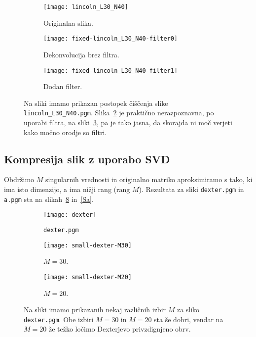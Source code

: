 \documentclass[a4 paper, 12pt]{article}
\begin{document}
\begin{figure}[H]\centering
	\begin{subfigure}[b]{0.3\textwidth}
		\texttt{[image: lincoln\_L30\_N40]}
		\caption{Originalna slika.}
		\label{sl41}
	\end{subfigure}
	\begin{subfigure}[b]{0.3\textwidth}
		\texttt{[image: fixed-lincoln\_L30\_N40-filter0]}
		\caption{Dekonvolucija brez filtra.}
		\label{sl42}
	\end{subfigure}
	\begin{subfigure}[b]{0.3\textwidth}
		\texttt{[image: fixed-lincoln\_L30\_N40-filter1]}
		\caption{Dodan filter.}
		\label{sl43}
	\end{subfigure}
	\caption{Na sliki imamo prikazan postopek \v ci\v s\v cenja slike {\tt lincoln\_L30\_N40.pgm}. Slika~\ref{sl42} je
	prakti\v cno nerazpoznavna, po uporabi filtra, na sliki~\ref{sl43}, pa je tako jasna, da skorajda ni mo\v c verjeti
	kako mo\v cno orodje so filtri.}
	\label{Sl4}
\end{figure}

\subsection{Kompresija slik z uporabo SVD}

Obdr\v zimo $M$ singularnih vrednosti in originalno matriko aproksimiramo s tako, ki ima isto dimenzijo, a ima ni\v zji rang
(rang $M$). Rezultata za sliki {\tt dexter.pgm} in {\tt a.pgm} sta na slikah~\ref{dexter} in~\ref{Sa}.

\begin{figure}[H]\centering
	\begin{subfigure}[b]{0.3\textwidth}
		\texttt{[image: dexter]}
		\caption{{\tt dexter.pgm}}
		\label{dexter1}
	\end{subfigure}
	\begin{subfigure}[b]{0.3\textwidth}
		\texttt{[image: small-dexter-M30]}
		\caption{$M = 30$.}
		\label{dexter2}
	\end{subfigure}
	\begin{subfigure}[b]{0.3\textwidth}
		\texttt{[image: small-dexter-M20]}
		\caption{$M = 20$.}
		\label{dexter3}
	\end{subfigure}
	\caption{Na sliki imamo prikazanih nekaj razli\v cnih izbir $M$ za sliko {\tt dexter.pgm}. Obe izbiri $M = 30$ in
		$M = 20$ sta \v se dobri, vendar na $M = 20$ \v ze te\v zko lo\v cimo Dexterjevo privzdignjeno obrv.}
	\label{dexter}
\end{figure}
\end{document}
